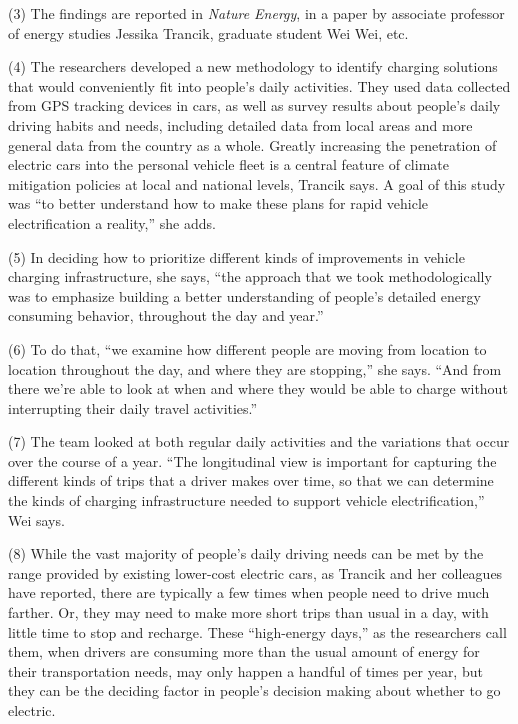 \documentclass[UTF8,11pt]{ctexart}
\begin{document}
(3) The findings are reported in \textit{Nature Energy}, in a paper by associate professor of energy studies Jessika Trancik, graduate student Wei Wei, etc.


(4) The researchers developed a new methodology to identify charging solutions that would conveniently fit into people’s daily activities. They used data collected from GPS tracking devices in cars, as well as survey results about people’s daily driving habits and needs, including detailed data from local areas and more general data from the country as a whole. Greatly increasing the penetration of electric cars into the personal vehicle fleet is a central feature of climate mitigation policies at local and national levels, Trancik says. A goal of this study was “to better understand how to make these plans for rapid vehicle electrification a reality,” she adds.


(5) In deciding how to prioritize different kinds of improvements in vehicle charging infrastructure, she says, “the approach that we took methodologically was to emphasize building a better understanding of people’s detailed energy consuming behavior, throughout the day and year.”


(6) To do that, “we examine how different people are moving from location to location throughout the day, and where they are stopping,” she says. “And from there we’re able to look at when and where they would be able to charge without interrupting their daily travel activities.”


(7) The team looked at both regular daily activities and the variations that occur over the course of a year. “The longitudinal view is important for capturing the different kinds of trips that a driver makes over time, so that we can determine the kinds of charging infrastructure needed to support vehicle electrification,” Wei says.


(8) While the vast majority of people’s daily driving needs can be met by the range provided by existing lower-cost electric cars, as Trancik and her colleagues have reported, there are typically a few times when people need to drive much farther. Or, they may need to make more short trips than usual in a day, with little time to stop and recharge. These “high-energy days,” as the researchers call them, when drivers are consuming more than the usual amount of energy for their transportation needs, may only happen a handful of times per year, but they can be the deciding factor in people’s decision making about whether to go electric.
\end{document}
